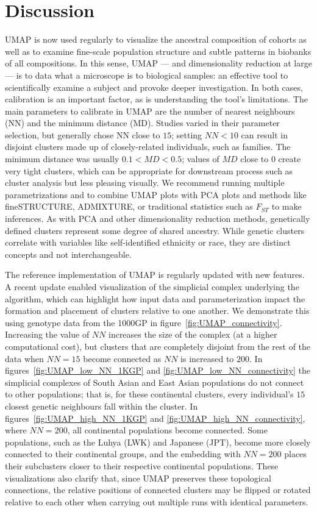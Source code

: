 \documentclass[12pt]{article}
\begin{document}
\section*{Discussion}
UMAP is now used regularly to visualize the ancestral composition of cohorts as well as to examine fine-scale population structure and subtle patterns in biobanks of all compositions. In this sense, UMAP --- and dimensionality reduction at large --- is to data what a microscope is to biological samples: an effective tool to scientifically examine a subject and provoke deeper investigation. In both cases, calibration is an important factor, as is understanding the tool's limitations. The main parameters to calibrate in UMAP are the number of nearest neighbours (NN) and the minimum distance (MD). Studies varied in their parameter selection, but generally chose NN close to $15$; setting $NN < 10$ can result in disjoint clusters made up of closely-related individuals, such as families. The minimum distance was usually $0.1 < MD < 0.5$; values of $MD$ close to $0$ create very tight clusters, which can be appropriate for  downstream process such as cluster analysis but less pleasing visually. We recommend running multiple parametrizations and to combine UMAP plots with PCA plots and methods like fineSTRUCTURE\cite{lawson2012inference}, ADMIXTURE\cite{alexander2009fast}, or traditional statistics such as $F_{ST}$ to make inferences. As with PCA and other dimensionality reduction methods, genetically defined clusters represent some degree of shared ancestry. While genetic clusters correlate with variables like self-identified ethnicity or race, they are distinct concepts and not interchangeable\cite{mathieson2020ancestry}.

The reference implementation of UMAP is regularly updated with new features\cite{mcinnes2018software}. A recent update enabled visualization of the simplicial complex underlying the algorithm, which can highlight how input data and parameterization impact the formation and placement of clusters relative to one another. We demonstrate this using genotype data from the 1000GP in figure~\ref{fig:UMAP_connectivity}. Increasing the value of $NN$ increases the size of the complex (at a higher computational cost), but clusters that are completely disjoint from the rest of the data when $NN=15$ become connected as $NN$ is increased to $200$. In figures~\ref{fig:UMAP_low_NN_1KGP} and \ref{fig:UMAP_low_NN_connectivity} the simplicial complexes of South Asian and East Asian populations do not connect to other populations; that is, for these continental clusters, every individual's $15$ closest genetic neighbours fall within the cluster. In figures~\ref{fig:UMAP_high_NN_1KGP} and \ref{fig:UMAP_high_NN_connectivity}, where $NN=200$, all continental populations become connected. Some populations, such as the Luhya (LWK) and Japanese (JPT), become more closely connected to their continental groups, and the embedding with $NN=200$ places their subclusters closer to their respective continental populations. These visualizations also clarify that, since UMAP preserves these topological connections, the relative positions of connected clusters may be flipped or rotated relative to each other when carrying out multiple runs with identical parameters.
\end{document}
